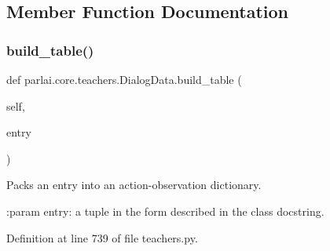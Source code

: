 \subsection{Member Function Documentation}
\mbox{\label{classparlai_1_1core_1_1teachers_1_1DialogData_a467bf261c35da2f5d2a34949281d2669}} 
\subsubsection{\texorpdfstring{build\+\_\+table()}{build\_table()}}
{\footnotesize\ttfamily def parlai.\+core.\+teachers.\+Dialog\+Data.\+build\+\_\+table (\begin{DoxyParamCaption}\item[{}]{self,  }\item[{}]{entry }\end{DoxyParamCaption})}

\begin{DoxyVerb}Packs an entry into an action-observation dictionary.

:param entry: a tuple in the form described in the class docstring.
\end{DoxyVerb}
 

Definition at line 739 of file teachers.\+py.


